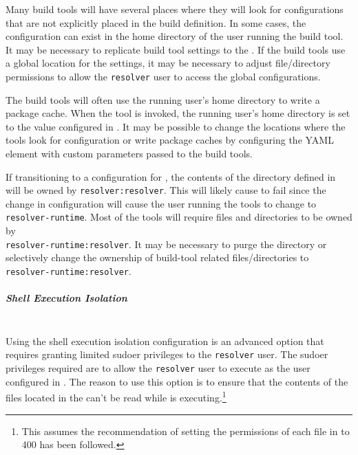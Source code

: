 Many build tools will have several places where they will look for configurations that are not explicitly placed in the build
definition.  In some cases, the configuration can exist in the home directory of the user running the build tool.  It may be necessary
to replicate build tool settings to the .  If the build tools use a global location
for the settings, it may be necessary to adjust file/directory permissions to allow the \texttt{resolver} user to access the global
configurations.

The build tools will often use the running user's home directory to write a package cache.  When the tool is invoked,
the running user's home directory is set to the value configured in .
It may be possible to change the locations where the tools look for configuration or write package caches by configuring the
 YAML element with
{custom parameters} passed to the build tools.

If transitioning to a configuration for , the contents of the directory
defined in  will be owned by \texttt{resolver:resolver}.  This will likely
cause \scaresolver to fail since the change in configuration will cause the user running the tools to change to
\texttt{resolver-runtime}.  Most of the tools will require files and directories to be owned by\\\texttt{resolver-runtime:resolver}.
It may be necessary to purge the  directory or selectively change
the ownership of build-tool related files/directories to \texttt{resolver-runtime:resolver}.


\subparagraph{Shell Execution Isolation}\label{par:shell-agent-isolation}
\noindent\\Using the shell execution isolation configuration is an advanced option that requires granting limited sudoer privileges
to the \texttt{resolver} user.  The sudoer privileges required are to allow the \texttt{resolver} user to execute \scaresolver
as the user configured in .  The reason to use this option is to ensure that
the contents of the files located in the  can't be read while \scaresolver
is executing.\footnote{This assumes the recommendation of setting the permissions of each file in 
 to 400 has been followed.}

